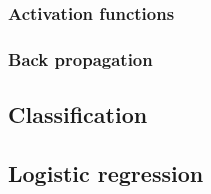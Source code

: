     \subsubsection{Activation functions}\label{sec:activation_function}

    \subsubsection{Back propagation}\label{sec:back_propagation}

\subsection{Classification}\label{sec:classification}

\subsection{Logistic regression}\label{sec:logistic_regression}

